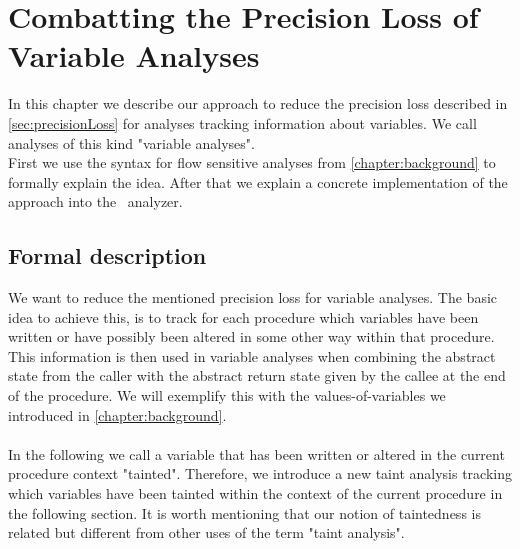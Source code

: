 
\chapter{Combatting the Precision Loss of Variable Analyses}\label{chapter:precisionLossVariableAnalyses}
  In this chapter we describe our approach to reduce the precision loss described in \autoref{sec:precisionLoss} for analyses tracking information about variables. We call analyses of this kind "variable analyses".\\
  First we use the syntax for flow sensitive analyses from \autoref{chapter:background} to formally explain the idea. After that we explain a concrete implementation of the approach into the \gob\ analyzer.
  \section{Formal description}
  We want to reduce the mentioned precision loss for variable analyses. The basic idea to achieve this, is to track for each procedure which variables have been written or have possibly been altered in some other way within that procedure. This information is then used in variable analyses when combining the abstract state from the caller with the abstract return state given by the callee at the end of the procedure. We will exemplify this with the values-of-variables we introduced in \autoref{chapter:background}.\\
  \\
  In the following we call a variable that has been written or altered in the current procedure context "tainted". Therefore, we introduce a new taint analysis tracking which variables have been tainted within the context of the current procedure in the following section. It is worth mentioning that our notion of taintedness is related but different from other uses of the term "taint analysis".\\
